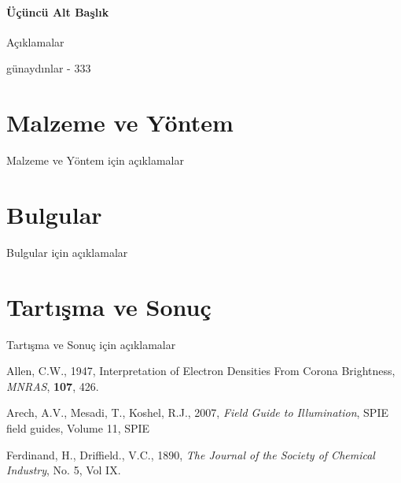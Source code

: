\documentclass[12pt, oneside]{iusosbil}
\begin{document}
\paragraph{Üçüncü Alt Başlık}
	Açıklamalar
	
\begin{definition}
	günaydınlar - 333
\end{definition}

\section{Malzeme ve Yöntem}
	Malzeme ve Yöntem için açıklamalar

\section{Bulgular}
	Bulgular için açıklamalar
	
\section{Tartışma ve Sonuç}
	Tartışma ve Sonuç için açıklamalar
	

\begin{thebibliography}{}	

Allen, C.W., 1947, Interpretation of Electron Densities From Corona Brightness, {\it MNRAS}, \textbf{107}, 426.

Arech, A.V., Mesadi, T., Koshel, R.J., 2007, \textit{Field Guide to Illumination}, SPIE field guides, Volume 11, SPIE

Ferdinand, H., Driffield., V.C., 1890, \textit{The Journal of the Society of Chemical Industry}, No. 5, Vol IX.
		
\end{thebibliography}
\end{document}
